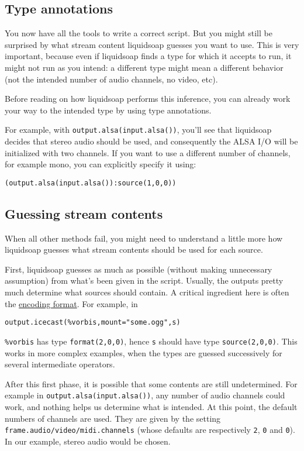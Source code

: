 \subsection{Type annotations}
You now have all the tools to write a correct script.
But you might still be surprised by what stream content liquidsoap
guesses you want to use.
This is very important, because even if liquidsoap finds a type
for which it accepts to run, it might not run as you intend:
a different type might mean a different behavior
(not the intended number of audio channels, no video, etc).

Before reading on how liquidsoap performs this inference,
you can already work your way to the intended type by using type
annotations.

For example, with \verb+output.alsa(input.alsa())+,
you'll see that liquidsoap decides that stereo audio should be used,
and consequently the ALSA I/O will be initialized with two channels.
If you want to use a different number of channels,
for example mono, you can explicitly specify it using:

\begin{verbatim}
(output.alsa(input.alsa()):source(1,0,0))
\end{verbatim}
\subsection{Guessing stream contents}
When all other methods fail, you might need to understand a little more
how liquidsoap guesses what stream contents should be used for
each source.

First, liquidsoap guesses as much as possible
(without making unnecessary assumption) from what's been given in the
script.
Usually, the outputs pretty much determine what sources should contain.
A critical ingredient here is often the
\href{encoding_formats.html}{encoding format}. For example, in

\begin{verbatim}
output.icecast(%vorbis,mount="some.ogg",s)
\end{verbatim}
\verb+%vorbis+ has type \verb+format(2,0,0)+, hence \verb+s+
should have type \verb+source(2,0,0)+. This works in more complex
examples, when the types are guessed successively for several intermediate
operators.

After this first phase, it is possible that some contents are still
undetermined. For example in \verb+output.alsa(input.alsa())+,
any number of audio channels could work, and nothing helps us determine
what is intended. At this point, the default numbers of channels are
used. They are given by the setting 
\verb+frame.audio/video/midi.channels+ (whose defaults are respectively
\verb+2+, \verb+0+ and \verb+0+). In our example,
stereo audio would be chosen.








